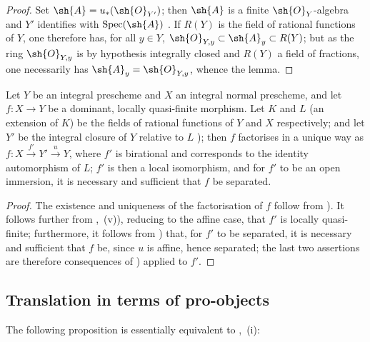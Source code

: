 \begin{proof}
Set $\sh{A}=u_*(\sh{O}_{Y'})$; then $\sh{A}$ is a finite $\sh{O}_Y$-algebra and $Y'$ identifies with $\operatorname{Spec}(\sh{A})$ .
If $R(Y)$ is the field of rational functions of $Y$, one therefore has, for all $y\in Y$, $\sh{O}_{Y,y}\subset\sh{A}_y\subset R(Y)$; but as the ring $\sh{O}_{Y,y}$ is by hypothesis integrally closed and $R(Y)$ a field of fractions, one necessarily has $\sh{A}_y=\sh{O}_{Y,y}$, whence the lemma.
\end{proof}

\begin{corollary}[8.12.11]
\label{IV.8.12.11}
Let $Y$ be an integral prescheme and $X$ an integral normal prescheme, and let $f:X\to Y$ be a dominant, locally quasi-finite morphism.
Let $K$ and $L$ (an extension of $K$) be the fields of rational functions of $Y$ and $X$ respectively; and let $Y'$ be the integral closure of $Y$ relative to $L$ ); then $f$ factorises in a unique way as $f:X\xrightarrow{f'}Y'\xrightarrow{u}Y$, where $f'$ is birational and corresponds to the identity automorphism of $L$; $f'$ is then a local isomorphism, and for $f'$ to be an open immersion, it is necessary and sufficient that $f$ be separated.
\end{corollary}

\begin{proof}
The existence and uniqueness of the factorisation of $f$ follow from ).
It follows further from ,~(v)), reducing to the affine case, that $f'$ is locally quasi-finite; furthermore, it follows from ) that, for $f'$ to be separated, it is necessary and sufficient that $f$ be, since $u$ is affine, hence separated; the last two assertions are therefore consequences of ) applied to $f'$.
\end{proof}


\subsection{Translation in terms of pro-objects}
\label{subsection:IV.8.13}

The following proposition is essentially equivalent to ,~(i):

